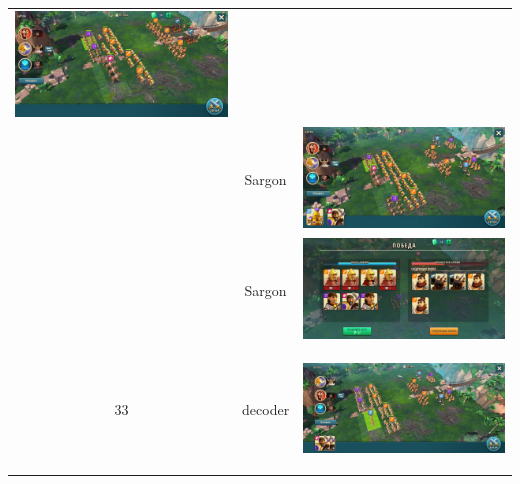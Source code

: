 \begin{longtable}{|c|c|c|}
	\includegraphics[width=0.75\linewidth]{./parts/media/TreasureHunt/33/sargon/photo_2022-04-07_10-06-37.jpg} \\
	& Sargon &
	\includegraphics[width=0.75\linewidth]{./parts/media/TreasureHunt/33/sargon/photo_2022-04-07_10-06-22.jpg} \\
	& Sargon &
	\includegraphics[width=0.75\linewidth]{./parts/media/TreasureHunt/33/sargon/photo_2022-04-07_10-06-34.jpg} \\
	\hline
	\multirow{8}{*}{33} & decoder &
	\hypertarget{fight33}{\includegraphics[width=0.75\linewidth]{./parts/media/TreasureHunt/33/decoder/photo_2022-04-07_10-02-11.jpg}} \\

\end{longtable}

